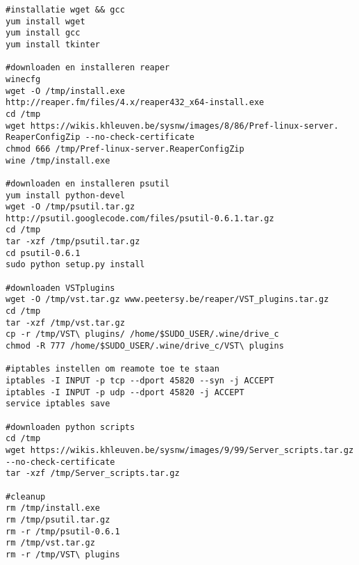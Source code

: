 \documentclass[DIV=calc]{scrartcl}
\begin{document}
\begin{lstlisting}[caption={Script-fedora-64bit.sh}, label=Fedora installatiescript 64bit]
#installatie wget && gcc
yum install wget
yum install gcc
yum install tkinter
 
#downloaden en installeren reaper
winecfg
wget -O /tmp/install.exe 
http://reaper.fm/files/4.x/reaper432_x64-install.exe
cd /tmp
wget https://wikis.khleuven.be/sysnw/images/8/86/Pref-linux-server.
ReaperConfigZip --no-check-certificate
chmod 666 /tmp/Pref-linux-server.ReaperConfigZip
wine /tmp/install.exe
 
#downloaden en installeren psutil
yum install python-devel
wget -O /tmp/psutil.tar.gz 
http://psutil.googlecode.com/files/psutil-0.6.1.tar.gz
cd /tmp
tar -xzf /tmp/psutil.tar.gz
cd psutil-0.6.1
sudo python setup.py install
 
#downloaden VSTplugins
wget -O /tmp/vst.tar.gz www.peetersy.be/reaper/VST_plugins.tar.gz
cd /tmp
tar -xzf /tmp/vst.tar.gz
cp -r /tmp/VST\ plugins/ /home/$SUDO_USER/.wine/drive_c
chmod -R 777 /home/$SUDO_USER/.wine/drive_c/VST\ plugins
 
#iptables instellen om reamote toe te staan
iptables -I INPUT -p tcp --dport 45820 --syn -j ACCEPT
iptables -I INPUT -p udp --dport 45820 -j ACCEPT
service iptables save
 
#downloaden python scripts
cd /tmp
wget https://wikis.khleuven.be/sysnw/images/9/99/Server_scripts.tar.gz 
--no-check-certificate
tar -xzf /tmp/Server_scripts.tar.gz
 
#cleanup
rm /tmp/install.exe
rm /tmp/psutil.tar.gz
rm -r /tmp/psutil-0.6.1
rm /tmp/vst.tar.gz
rm -r /tmp/VST\ plugins
\end{lstlisting}
\end{document}
